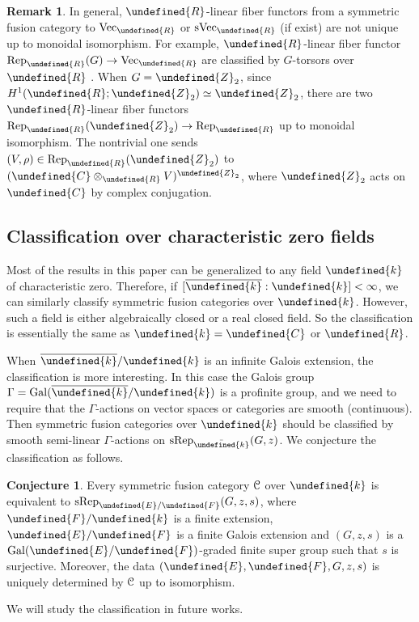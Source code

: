 \documentclass[10pt]{article}
\let\mathbb\undefined
\theoremstyle{definition}
\newtheorem{conj}[thm]{Conjecture}
\newtheorem{rem}[thm]{Remark}
\numberwithin{equation}{section}
\numberwithin{thm}{section}
\newcommand{\Cb}{\mathbb{C}}
\newcommand{\Rb}{\mathbb{R}}
\newcommand{\Zb}{\mathbb{Z}}
\newcommand{\bk}{\mathbb{k}}
\newcommand{\Eb}{\mathbb{E}}
\newcommand{\Fb}{\mathbb{F}}
\newcommand{\CC}{\EuScript{C}}
\DeclareMathOperator{\Gal}{Gal}
\newcommand{\vect}{\mathrm{Vec}}
\newcommand{\svect}{\mathrm{sVec}}
\newcommand{\rep}{\mathrm{Rep}}
\newcommand{\srep}{\mathrm{sRep}}
\begin{document}
\begin{rem}
In general, $\Rb$-linear fiber functors from a symmetric fusion category to $\vect_\Rb$ or $\svect_\Rb$ (if exist) are not unique up to monoidal isomorphism. For example, $\Rb$-linear fiber functor $\rep_\Rb(G) \to \vect_\Rb$ are classified by $G$-torsors over $\Rb$ \cite[Theorem 3.2]{DM82}. When $G = \Zb_2$, since $H^1(\Rb;\Zb_2) \simeq \Zb_2$, there are two $\Rb$-linear fiber functors $\rep_\Rb(\Zb_2) \to \rep_\Rb$ up to monoidal isomorphism. The nontrivial one sends $(V,\rho) \in \rep_\Rb(\Zb_2)$ to $(\Cb \otimes_\Rb V)^{\Zb_2}$, where $\Zb_2$ acts on $\Cb$ by complex conjugation.
\end{rem}

\subsection{Classification over characteristic zero fields}

Most of the results in this paper can be generalized to any field $\bk$ of characteristic zero. Therefore, if $[\overline{\bk} : \bk] < \infty$, we can similarly classify symmetric fusion categories over $\bk$. However, such a field is either algebraically closed or a real closed field. So the classification is essentially the same as $\bk = \Cb$ or $\Rb$.

When $\overline{\bk}/\bk$ is an infinite Galois extension, the classification is more interesting. In this case the Galois group $\Gamma = \Gal(\overline{\bk}/\bk)$ is a profinite group, and we need to require that the $\Gamma$-actions on vector spaces or categories are smooth (continuous). Then symmetric fusion categories over $\bk$ should be classified by smooth semi-linear $\Gamma$-actions on $\srep_{\bar \bk}(G,z)$. We conjecture the classification as follows.

\begin{conj}
Every symmetric fusion category $\CC$ over $\bk$ is equivalent to $\srep_{\Eb/\Fb}(G,z,s)$, where $\Fb/\bk$ is a finite extension, $\Eb/\Fb$ is a finite Galois extension and $(G,z,s)$ is a $\Gal(\Eb/\Fb)$-graded finite super group such that $s$ is surjective. Moreover, the data $(\Eb,\Fb,G,z,s)$ is uniquely determined by $\CC$ up to isomorphism.
\end{conj}

We will study the classification in future works.




\end{document}
